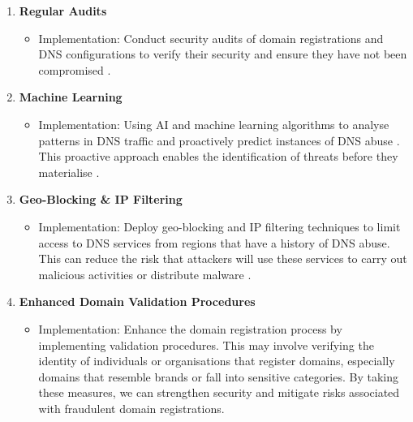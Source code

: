 \begin{enumerate}
\begin{itemize}
    \end{itemize}
    \item \textbf{Regular Audits}
    \begin{itemize}
        \item Implementation: Conduct security audits of domain registrations and DNS configurations to verify their security and ensure they have not been compromised \cite{coronado2014auditing}.
    \end{itemize}
    \item \textbf{Machine Learning}
    \begin{itemize}
        \item Implementation: Using AI and machine learning algorithms to analyse patterns in DNS traffic and proactively predict instances of DNS abuse \cite{icannndnssec}. This proactive approach enables the identification of threats before they materialise \cite{tsukerman2019machine}.
    \end{itemize}
    \item \textbf{Geo-Blocking \& IP Filtering}
    \begin{itemize}
        \item Implementation: Deploy geo-blocking and IP filtering techniques to limit access to DNS services from regions that have a history of DNS abuse. This can reduce the risk that attackers will use these services to carry out malicious activities or distribute malware \cite{meeseedited}.
    \end{itemize}
    \item \textbf{Enhanced Domain Validation Procedures}
    \begin{itemize}
        \item Implementation: Enhance the domain registration process by implementing validation procedures. This may involve verifying the identity of individuals or organisations that register domains, especially domains that resemble brands or fall into sensitive categories. By taking these measures, we can strengthen security and mitigate risks associated with fraudulent domain registrations.
    \end{itemize}
\end{enumerate}


